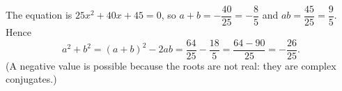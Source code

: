 The equation is $25x^2+40x+45=0$, so $a+b=-\dfrac{40}{25}=-\dfrac85$ and $ab=\dfrac{45}{25}=\dfrac95$. Hence
\[a^2+b^2=(a+b)^2-2ab=\dfrac{64}{25}-\dfrac{18}{5}=\dfrac{64-90}{25}=\boxed{-\dfrac{26}{25}}.\]
(A negative value is possible because the roots are not real: they are complex conjugates.)
